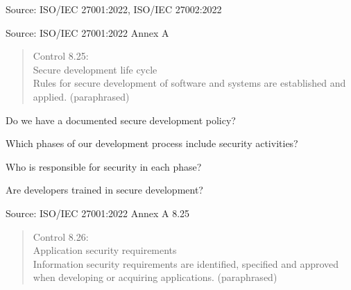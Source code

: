 \documentclass[Screen16to9,17pt]{foils}
\begin{document}
Source: ISO/IEC 27001:2022, ISO/IEC 27002:2022



Source: ISO/IEC 27001:2022 Annex A


\begin{quote}
Control 8.25:\\
Secure development life cycle\\
Rules for secure development of software and systems are established and applied. (paraphrased)
\end{quote}

\begin{list1}
\item Do we have a documented secure development policy?
\item Which phases of our development process include security activities?
\item Who is responsible for security in each phase?
\item Are developers trained in secure development?
\end{list1}

Source: ISO/IEC 27001:2022 Annex A 8.25


\begin{quote}
Control 8.26:\\
Application security requirements\\
Information security requirements are identified, specified and approved when developing or acquiring applications. (paraphrased)
\end{quote}
\end{document}
